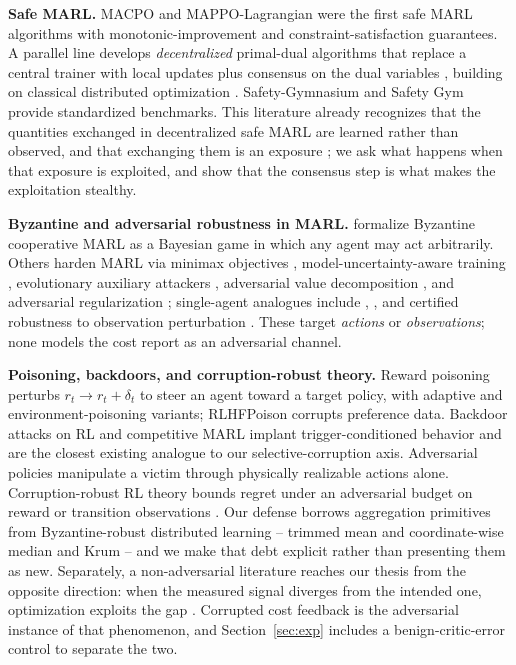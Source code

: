 \documentclass{article}
\begin{document}
\textbf{Safe MARL.} MACPO and MAPPO-Lagrangian \citep{gu2023macpo} were the first safe MARL algorithms with monotonic-improvement and constraint-satisfaction guarantees. A parallel line develops \emph{decentralized} primal-dual algorithms that replace a central trainer with local updates plus consensus on the dual variables \citep{lu2021decentralized,ying2024scalable,kahe2024distributed}, building on classical distributed optimization \citep{nedic2009distributed}. Safety-Gymnasium \citep{ji2023safetygym} and Safety Gym \citep{ray2019benchmarking} provide standardized benchmarks. This literature already recognizes that the quantities exchanged in decentralized safe MARL are learned rather than observed, and that exchanging them is an exposure \citep{kahe2024distributed}; we ask what happens when that exposure is exploited, and show that the consensus step is what makes the exploitation stealthy.

\textbf{Byzantine and adversarial robustness in MARL.} \citet{li2024byzantine} formalize Byzantine cooperative MARL as a Bayesian game in which any agent may act arbitrarily. Others harden MARL via minimax objectives \citep{li2019robust}, model-uncertainty-aware training \citep{zhang2020robustmodel}, evolutionary auxiliary attackers \citep{yuan2023robust}, adversarial value decomposition \citep{phan2021resilient}, and adversarial regularization \citep{bukharin2024robust}; single-agent analogues include \citet{pinto2017robust}, \citet{tessler2019action}, and certified robustness to observation perturbation \citep{zhang2020robustdeep,huang2017adversarial}. These target \emph{actions} or \emph{observations}; none models the cost report as an adversarial channel.

\textbf{Poisoning, backdoors, and corruption-robust theory.} Reward poisoning perturbs $r_t \to r_t + \delta_t$ to steer an agent toward a target policy, with adaptive \citep{zhang2020adaptive} and environment-poisoning \citep{rakhsha2020policyteaching} variants; RLHFPoison \citep{wang2024rlhfpoison} corrupts preference data. Backdoor attacks on RL \citep{kiourti2020trojdrl} and competitive MARL \citep{wang2021backdoorl} implant trigger-conditioned behavior and are the closest existing analogue to our selective-corruption axis. Adversarial policies \citep{gleave2020adversarial} manipulate a victim through physically realizable actions alone. Corruption-robust RL theory bounds regret under an adversarial budget on reward or transition observations \citep{lykouris2024corruption,ye2024towards}. Our defense borrows aggregation primitives from Byzantine-robust distributed learning -- trimmed mean and coordinate-wise median \citep{yin2018byzantine} and Krum \citep{blanchard2017krum} -- and we make that debt explicit rather than presenting them as new. Separately, a non-adversarial literature reaches our thesis from the opposite direction: when the measured signal diverges from the intended one, optimization exploits the gap \citep{amodei2016concrete,skalse2022defining}. Corrupted cost feedback is the adversarial instance of that phenomenon, and Section~\ref{sec:exp} includes a benign-critic-error control to separate the two.
\end{document}
